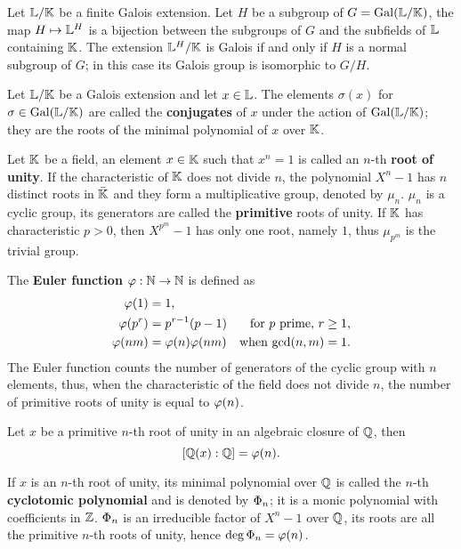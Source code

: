 \begin{theorem}
  Let $\mathbb{L}/\mathbb{K}$ be a finite Galois extension. Let $H$ be a subgroup of
  $G=\operatorname{Gal}(\mathbb{L}/\mathbb{K})$, the map $H\mapsto \mathbb{L}^H$ is a bijection between
  the subgroups of $G$ and the subfields of $\mathbb{L}$ containing $\mathbb{K}$. The
  extension $\mathbb{L}^H/\mathbb{K}$ is Galois if and only if $H$ is a normal
  subgroup of $G$; in this case its Galois group is isomorphic to
  $G/H$.
\end{theorem}

Let $\mathbb{L}/\mathbb{K}$ be a Galois extension and let $x\in\mathbb{L}$. The elements
$\sigma(x)$ for $\sigma\in\operatorname{Gal}(\mathbb{L}/\mathbb{K})$ are called the
\textbf{conjugates} of $x$ under the action
of $\operatorname{Gal}(\mathbb{L}/\mathbb{K})$; they are the roots of the minimal polynomial of $x$
over $\mathbb{K}$.

Let $\mathbb{K}$ be a field, an element $x\in \mathbb{K}$ such that $x^n=1$ is called
an $n$-th \textbf{root of unity}. If the
characteristic of $\mathbb{K}$ does not divide $n$, the polynomial $X^n-1$ has
$n$ distinct roots in $\bar{\mathbb{K}}$ and they form a multiplicative
group, denoted by $\mu_n$. $\mu_n$ is a cyclic group, its generators
are called the  \textbf{primitive}
roots of unity.  If $\mathbb{K}$ has characteristic $p>0$, then $X^{p^m}-1$
has only one root, namely $1$, thus $\mu_{p^m}$ is the trivial group.

The \textbf{Euler function}
$\varphi:\mathbb{N}\rightarrow\mathbb{N}$ is
defined as
\begin{align*}
  \varphi(1) &= 1\text{,}\\
  \varphi(p^r) &= p^{r-1}(p-1) &\text{for $p$ prime, $r\ge1$,}\\
  \varphi(nm) &= \varphi(n)\varphi(nm) &\text{when $\gcd(n,m)=1$.}
\end{align*}
The Euler function counts the number of generators of the cyclic group
with $n$ elements, thus, when the characteristic of the field does not
divide $n$, the number of primitive roots of unity is equal to $\varphi(n)$.

\begin{theorem}
  Let $x$ be a primitive $n$-th root of unity in an algebraic closure
  of $\mathbb{Q}$, then
  \[[\mathbb{Q}(x):\mathbb{Q}]=\varphi(n)\text{.}\]
\end{theorem}

If $x$ is an $n$-th root of unity, its minimal polynomial over $\mathbb{Q}$ is
called the $n$-th \textbf{cyclotomic
  polynomial} and is denoted by
$\Phi_n$;
it is a monic polynomial with coefficients in $\mathbb{Z}$. $\Phi_n$ is an
irreducible factor of $X^n-1$ over $\mathbb{Q}$, its roots are all the
primitive $n$-th roots of unity, hence $\deg\Phi_n=\varphi(n)$.

